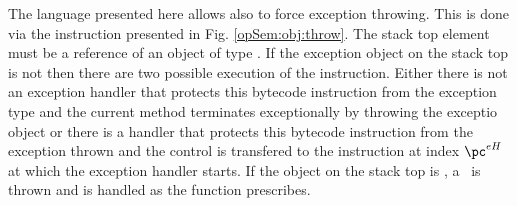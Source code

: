 \begin{figure}[ht!]
\end{figure}



The language presented here allows also to force  exception throwing. This is done via the
 instruction \athrow{} presented in Fig. \ref{opSem:obj:throw}.    The stack top element  must be a reference of an object of type  \Throwable. 
	 If the exception object \stackOnlyParam{\counterOnly} on the stack top is not \Mynull{} then there are two possible execution of the instruction.
	  Either there is not an exception handler  that protects this bytecode instruction from the 
	  exception type and the current method \methodd{} terminates exceptionally by throwing the exceptio object \stackOnlyParam{\counterOnly} or
	   there is a handler that protects this bytecode instruction from the exception thrown and the control is transfered
	  to the instruction at index $\pc^{eH}$  at which the exception handler starts. %
	  If the object on the stack top is \Mynull, a \NullPointerExc \ is thrown and is handled as the function \getStateAfterExc{} prescribes. 


